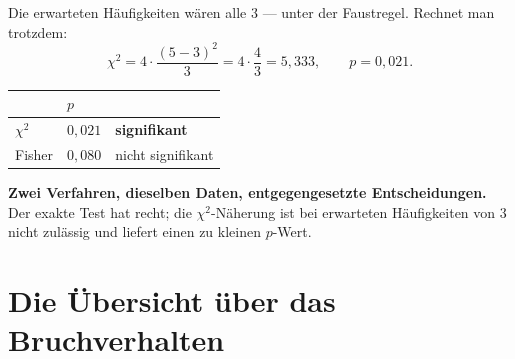 \begin{merksatz}
Die erwarteten Häufigkeiten wären alle $3$ --- unter der Faustregel. Rechnet man trotzdem:
\[ \chi^2 = 4 \cdot \frac{(5-3)^2}{3} = 4 \cdot \frac{4}{3} = 5{,}333, \qquad p = 0{,}021 . \]

\begin{center}
\renewcommand{\arraystretch}{1.48}
\begin{tabular}{@{}P{2.6cm}P{2.0cm}P{2.8cm}@{}}
\toprule
& $p$ & \\
\midrule
$\chi^2$ & $0{,}021$ & \textcolor{akzent}{\textbf{signifikant}}\\
Fisher & $0{,}080$ & \textcolor{gruen}{nicht signifikant}\\
\bottomrule
\end{tabular}
\end{center}

\begin{center}
\begin{minipage}{0.9\textwidth}
\textbf{Zwei Verfahren, dieselben Daten, entgegengesetzte Entscheidungen.} Der exakte Test hat recht; die $\chi^2$-Näherung ist bei erwarteten Häufigkeiten von $3$ nicht zulässig und liefert einen zu kleinen $p$-Wert.
\end{minipage}
\end{center}

\begin{center}
\begin{minipage}{0.88\textwidth}
\end{minipage}
\end{center}
\end{merksatz}

\section{Die Übersicht über das Bruchverhalten}

